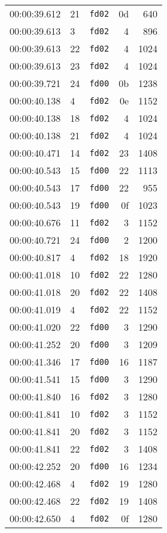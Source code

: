 \documentclass{article}
\begin{document}
\begin{longtable}{lllrr}
00:00:39.612 & 21 & \texttt{fd02} & 0d & 640 \\
00:00:39.613 & 3 & \texttt{fd02} & 4 & 896 \\
00:00:39.613 & 22 & \texttt{fd02} & 4 & 1024 \\
00:00:39.613 & 23 & \texttt{fd02} & 4 & 1024 \\
00:00:39.721 & 24 & \texttt{fd00} & 0b & 1238 \\
00:00:40.138 & 4 & \texttt{fd02} & 0e & 1152 \\
00:00:40.138 & 18 & \texttt{fd02} & 4 & 1024 \\
00:00:40.138 & 21 & \texttt{fd02} & 4 & 1024 \\
00:00:40.471 & 14 & \texttt{fd02} & 23 & 1408 \\
00:00:40.543 & 15 & \texttt{fd00} & 22 & 1113 \\
00:00:40.543 & 17 & \texttt{fd00} & 22 & 955 \\
00:00:40.543 & 19 & \texttt{fd00} & 0f & 1023 \\
00:00:40.676 & 11 & \texttt{fd02} & 3 & 1152 \\
00:00:40.721 & 24 & \texttt{fd00} & 2 & 1200 \\
00:00:40.817 & 4 & \texttt{fd02} & 18 & 1920 \\
00:00:41.018 & 10 & \texttt{fd02} & 22 & 1280 \\
00:00:41.018 & 20 & \texttt{fd02} & 22 & 1408 \\
00:00:41.019 & 4 & \texttt{fd02} & 22 & 1152 \\
00:00:41.020 & 22 & \texttt{fd00} & 3 & 1290 \\
00:00:41.252 & 20 & \texttt{fd00} & 3 & 1209 \\
00:00:41.346 & 17 & \texttt{fd00} & 16 & 1187 \\
00:00:41.541 & 15 & \texttt{fd00} & 3 & 1290 \\
00:00:41.840 & 16 & \texttt{fd02} & 3 & 1280 \\
00:00:41.841 & 10 & \texttt{fd02} & 3 & 1152 \\
00:00:41.841 & 20 & \texttt{fd02} & 3 & 1152 \\
00:00:41.841 & 22 & \texttt{fd02} & 3 & 1408 \\
00:00:42.252 & 20 & \texttt{fd00} & 16 & 1234 \\
00:00:42.468 & 4 & \texttt{fd02} & 19 & 1280 \\
00:00:42.468 & 22 & \texttt{fd02} & 19 & 1408 \\
00:00:42.650 & 4 & \texttt{fd02} & 0f & 1280 \\

\end{longtable}
\end{document}
